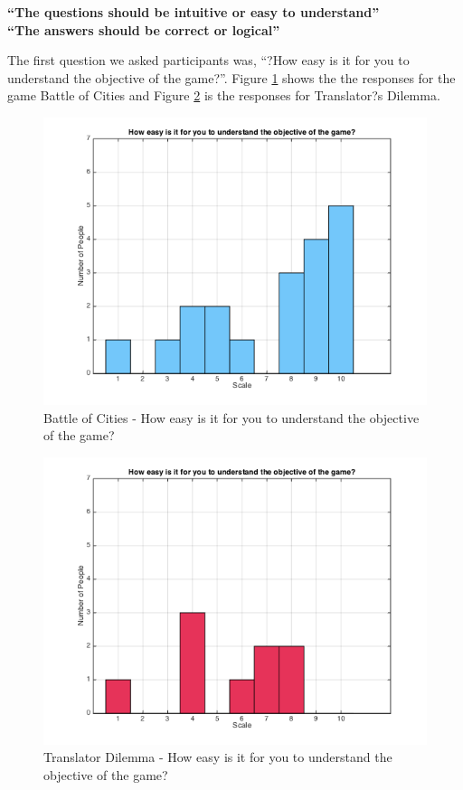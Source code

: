 \documentclass{sig-alternate}
\begin{document}
{\textbf{
``The questions should be intuitive or easy to understand''\\
``The answers should be correct or logical''
}

The first question we asked participants was, ``?How easy is it for you to understand the objective of the game?''. 
Figure \ref{fig:p_easy_understand} shows the the responses for the game Battle of Cities and Figure \ref{fig:t_easy_understand} is the responses for Translator?s Dilemma. 

\begin{figure}
	\includegraphics[width=\linewidth]{p_easy_understand.png}
	\caption{Battle of Cities - How easy is it for you to understand the objective of the game?}
	\label{fig:p_easy_understand}
\end{figure}

\begin{figure}
	\includegraphics[width=\linewidth]{t_easy_understand.png}
	\caption{Translator Dilemma - How easy is it for you to understand the objective of the game?}
	\label{fig:t_easy_understand}
\end{figure}

}
\end{document}
